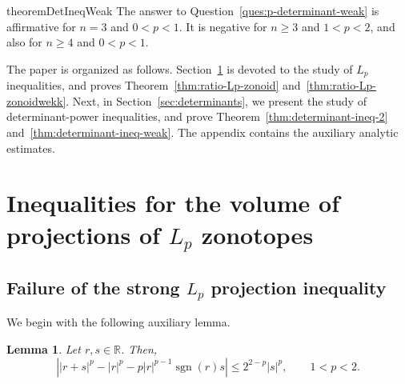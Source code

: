 \documentclass[11pt,a4paper]{amsart}
\theoremstyle{plain}
\newtheorem{lemma}[theorem]{Lemma}
\theoremstyle{definition}
\newcommand{\R}{\mathbb R}
\begin{document}
\begin{restatable}{theorem}{DetIneqWeak}\label{thm:determinant-ineq-weak}
The answer to Question~\ref{ques:p-determinant-weak} is affirmative for
$n=3$ and $0<p<1$.  It is negative for $n\geq3$ and $1<p<2$, and also for
$n\geq4$ and $0<p<1$.
\end{restatable}

The paper is organized as follows.  Section~\ref{sec:strong-lp-0} is devoted to the study of $L_p$ inequalities, and proves Theorem~\ref{thm:ratio-Lp-zonoid} and~\ref{thm:ratio-Lp-zonoidwekk}.
Next, in Section~\ref{sec:determinants}, we present the study of determinant-power inequalities, and prove Theorem~\ref {thm:determinant-ineq-2} and~\ref{thm:determinant-ineq-weak}. The appendix contains the auxiliary analytic estimates.


\section{Inequalities for the volume of projections of \texorpdfstring{$L_p$}{Lp} zonotopes} \label{sec:strong-lp-0}
\subsection{Failure of the strong \texorpdfstring{$L_p$}{Lp} projection inequality}\label{sec:strong-lp}
We begin with the following auxiliary lemma.
\begin{lemma} \label{lem:p-taylor-remainder}
    Let $r,s \in \R$. Then,
    \begin{equation}
    \label{eq:p-taylor-remainder}
    \left|
        |r+s|^p-|r|^p
        -p|r|^{p-1}\operatorname{sgn}(r)s
    \right|
    \leq 2^{2-p}|s|^p,
    \qquad 1<p<2.
\end{equation}
\end{lemma}
\end{document}
